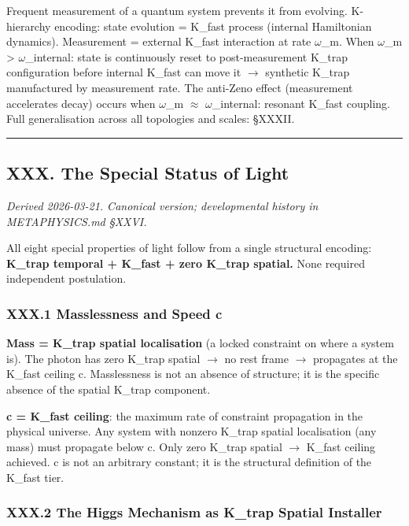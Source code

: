 \documentclass[12pt,a4paper]{article}
\begin{document}
Frequent measurement of a quantum system prevents it from evolving. K-hierarchy encoding: state evolution = K\_fast process (internal Hamiltonian dynamics). Measurement = external K\_fast interaction at rate $\omega$\_m. When $\omega$\_m \textgreater{} $\omega$\_internal: state is continuously reset to post-measurement K\_trap configuration before internal K\_fast can move it $\rightarrow$ synthetic K\_trap manufactured by measurement rate. The anti-Zeno effect (measurement accelerates decay) occurs when $\omega$\_m $\approx$ $\omega$\_internal: resonant K\_fast coupling. Full generalisation across all topologies and scales: §XXXII.

\begin{center}
\rule{0.5\textwidth}{0.4pt}
\end{center}

\subsection{XXX. The Special Status of Light}

\emph{Derived 2026-03-21. Canonical version; developmental history in METAPHYSICS.md §XXVI.}

All eight special properties of light follow from a single structural encoding: \textbf{K\_trap temporal + K\_fast + zero K\_trap spatial.} None required independent postulation.

\subsubsection{XXX.1 Masslessness and Speed c}

\textbf{Mass = K\_trap spatial localisation} (a locked constraint on where a system is). The photon has zero K\_trap spatial $\rightarrow$ no rest frame $\rightarrow$ propagates at the K\_fast ceiling c. Masslessness is not an absence of structure; it is the specific absence of the spatial K\_trap component.

\textbf{c = K\_fast ceiling}: the maximum rate of constraint propagation in the physical universe. Any system with nonzero K\_trap spatial localisation (any mass) must propagate below c. Only zero K\_trap spatial $\rightarrow$ K\_fast ceiling achieved. c is not an arbitrary constant; it is the structural definition of the K\_fast tier.

\subsubsection{XXX.2 The Higgs Mechanism as K\_trap Spatial Installer}
\end{document}
